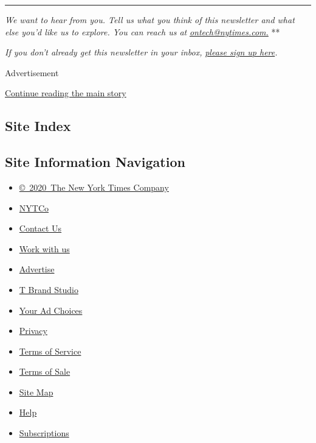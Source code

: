 \begin{center}\rule{0.5\linewidth}{\linethickness}\end{center}

\emph{We want to hear from you. Tell us what you think of this
newsletter and what else you'd like us to explore. You can reach us at}
\href{mailto:ontech@nytimes.com?subject=On\%20Tech\%20Feedback}{\emph{ontech@nytimes.com.}}
**

\emph{If you don't already get this newsletter in your inbox,}
\href{https://www.nytimes.com/newsletters/signup/OT}{\emph{please sign
up here}}\emph{.}

Advertisement

\protect\hyperlink{after-bottom}{Continue reading the main story}

\hypertarget{site-index}{%
\subsection{Site Index}\label{site-index}}

\hypertarget{site-information-navigation}{%
\subsection{Site Information
Navigation}\label{site-information-navigation}}

\begin{itemize}
\tightlist
\item
  \href{https://help.nytimes.com/hc/en-us/articles/115014792127-Copyright-notice}{©~2020~The
  New York Times Company}
\end{itemize}

\begin{itemize}
\tightlist
\item
  \href{https://www.nytco.com/}{NYTCo}
\item
  \href{https://help.nytimes.com/hc/en-us/articles/115015385887-Contact-Us}{Contact
  Us}
\item
  \href{https://www.nytco.com/careers/}{Work with us}
\item
  \href{https://nytmediakit.com/}{Advertise}
\item
  \href{http://www.tbrandstudio.com/}{T Brand Studio}
\item
  \href{https://www.nytimes.com/privacy/cookie-policy\#how-do-i-manage-trackers}{Your
  Ad Choices}
\item
  \href{https://www.nytimes.com/privacy}{Privacy}
\item
  \href{https://help.nytimes.com/hc/en-us/articles/115014893428-Terms-of-service}{Terms
  of Service}
\item
  \href{https://help.nytimes.com/hc/en-us/articles/115014893968-Terms-of-sale}{Terms
  of Sale}
\item
  \href{https://spiderbites.nytimes.com}{Site Map}
\item
  \href{https://help.nytimes.com/hc/en-us}{Help}
\item
  \href{https://www.nytimes.com/subscription?campaignId=37WXW}{Subscriptions}
\end{itemize}
